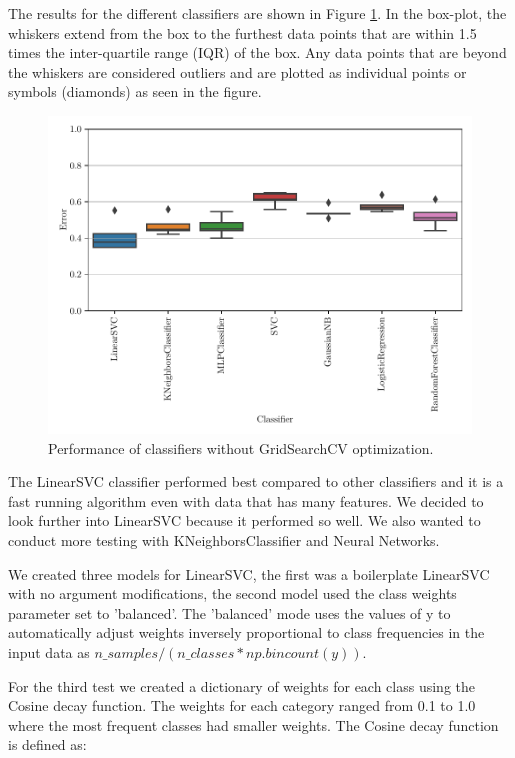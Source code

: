 The results for the different classifiers are shown in Figure \ref{fig:explore_classifiers}. In the box-plot, the whiskers extend from the box to the furthest data points that are within 1.5 times the inter-quartile range (IQR) of the box. Any data points that are beyond the whiskers are considered outliers and are plotted as individual points or symbols (diamonds) as seen in the figure.


\begin{figure}[ht]
  \centering
  \includegraphics[width=\textwidth]{../img/plot_explore_classifiers.pdf}
  \caption{Performance of classifiers without GridSearchCV optimization.}
  \label{fig:explore_classifiers}
\end{figure} 

The LinearSVC classifier performed best compared to other classifiers and it is a fast running algorithm even with data that has many features. We decided to look further into LinearSVC because it performed so well. We also wanted to conduct more testing with KNeighborsClassifier and Neural Networks. 

We created three models for LinearSVC, the first was a boilerplate LinearSVC with no argument modifications, the second model used the class weights parameter set to 'balanced'. The 'balanced' mode uses the values of y to automatically adjust weights inversely proportional to class frequencies in the input data as $n\_samples / (n\_classes * np.bincount(y))$. 

For the third test we created a dictionary of weights for each class using the Cosine decay function. The weights for each category ranged from 0.1 to 1.0 where the most frequent classes had smaller weights. The Cosine decay function is defined as:

